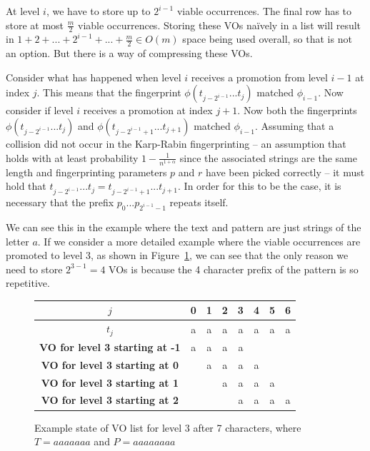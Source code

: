 \documentclass[ %
                    author={Dominic Joseph Moylett},
                    degree={MEng},
                     title={Dictionary Matching with Fingerprints},
                  subtitle={An Empirical Analysis},
                      type={research},
                      year={2015} ]{dissertation}
\begin{document}
At level $i$, we have to store up to $2^{i - 1}$ viable occurrences. The final row has to store at most $\frac{m}{2}$ viable occurrences. Storing these VOs na\"{i}vely in a list will result in $1 + 2 + ... + 2^{i - 1} + ... + \frac{m}{2} \in O(m)$ space being used overall, so that is not an option. But there is a way of compressing these VOs.

Consider what has happened when level $i$ receives a promotion from level $i-1$ at index $j$. This means that the fingerprint $\phi(t_{j - 2^{i-1}}...t_j)$ matched $\phi_{i-1}$. Now consider if level $i$ receives a promotion at index $j+1$. Now both the fingerprints $\phi(t_{j - 2^{i-1}}...t_j)$ and $\phi(t_{j - 2^{i-1} + 1}...t_{j + 1})$ matched $\phi_{i-1}$. Assuming that a collision did not occur in the Karp-Rabin fingerprinting  --  an assumption that holds with at least probability $1 - \frac{1}{n^{1 + \alpha}}$ since the associated strings are the same length and fingerprinting parameters $p$ and $r$ have been picked correctly  --  it must hold that $t_{j - 2^{i-1}}...t_j = t_{j - 2^{i-1} + 1}...t_{j + 1}$. In order for this to be the case, it is necessary that the prefix $p_0...p_{2^{i-1} - 1}$ repeats itself.

We can see this in the example where the text and pattern are just strings of the letter $a$. If we consider a more detailed example where the viable occurrences are promoted to level 3, as shown in Figure~\ref{fig:pp-level-3}, we can see that the only reason we need to store $2^{3-1} = 4$ VOs is because the 4 character prefix of the pattern is so repetitive.

\begin{figure}[t]
\centering
\begin{tabular}{|c|c c c c c c c|}
  \hline
  $j$ & 0 & 1 & 2 & 3 & 4 & 5 & 6 \\
  \hline
  $t_j$ & a & a & a & a & a & a & a \\
  \hline
  \textbf{VO for level 3 starting at -1} & a & a & a & a &  &  &  \\
  \hline
  \textbf{VO for level 3 starting at 0} &  & a & a & a & a &  &  \\
  \hline
  \textbf{VO for level 3 starting at 1} &  &  & a & a & a & a &  \\
  \hline
  \textbf{VO for level 3 starting at 2} &  &  &  & a & a & a & a \\
  \hline
\end{tabular}
\caption{Example state of VO list for level 3 after 7 characters, where $T = aaaaaaa$ and $P = aaaaaaaa$}
\label{fig:pp-level-3}
\end{figure}
\end{document}
